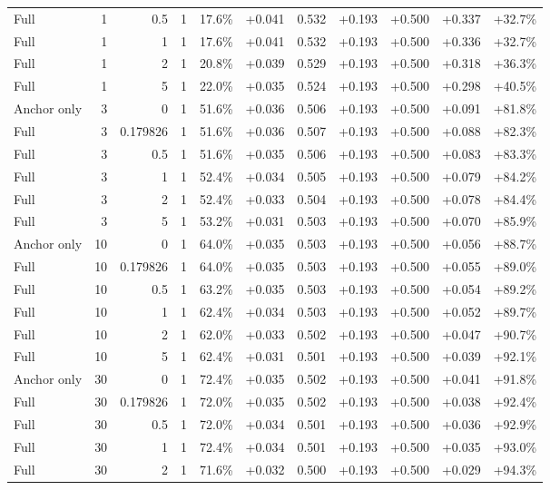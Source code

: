 \begin{table}[htbp]
\begin{tabular}{lrrrccccccc}
Full & 1 & 0.5 & 1 & 17.6\% & +0.041 & 0.532 & +0.193 & +0.500 & +0.337 & +32.7\% \\
Full & 1 & 1 & 1 & 17.6\% & +0.041 & 0.532 & +0.193 & +0.500 & +0.336 & +32.7\% \\
Full & 1 & 2 & 1 & 20.8\% & +0.039 & 0.529 & +0.193 & +0.500 & +0.318 & +36.3\% \\
Full & 1 & 5 & 1 & 22.0\% & +0.035 & 0.524 & +0.193 & +0.500 & +0.298 & +40.5\% \\
Anchor only & 3 & 0 & 1 & 51.6\% & +0.036 & 0.506 & +0.193 & +0.500 & +0.091 & +81.8\% \\
Full & 3 & 0.179826 & 1 & 51.6\% & +0.036 & 0.507 & +0.193 & +0.500 & +0.088 & +82.3\% \\
Full & 3 & 0.5 & 1 & 51.6\% & +0.035 & 0.506 & +0.193 & +0.500 & +0.083 & +83.3\% \\
Full & 3 & 1 & 1 & 52.4\% & +0.034 & 0.505 & +0.193 & +0.500 & +0.079 & +84.2\% \\
Full & 3 & 2 & 1 & 52.4\% & +0.033 & 0.504 & +0.193 & +0.500 & +0.078 & +84.4\% \\
Full & 3 & 5 & 1 & 53.2\% & +0.031 & 0.503 & +0.193 & +0.500 & +0.070 & +85.9\% \\
Anchor only & 10 & 0 & 1 & 64.0\% & +0.035 & 0.503 & +0.193 & +0.500 & +0.056 & +88.7\% \\
Full & 10 & 0.179826 & 1 & 64.0\% & +0.035 & 0.503 & +0.193 & +0.500 & +0.055 & +89.0\% \\
Full & 10 & 0.5 & 1 & 63.2\% & +0.035 & 0.503 & +0.193 & +0.500 & +0.054 & +89.2\% \\
Full & 10 & 1 & 1 & 62.4\% & +0.034 & 0.503 & +0.193 & +0.500 & +0.052 & +89.7\% \\
Full & 10 & 2 & 1 & 62.0\% & +0.033 & 0.502 & +0.193 & +0.500 & +0.047 & +90.7\% \\
Full & 10 & 5 & 1 & 62.4\% & +0.031 & 0.501 & +0.193 & +0.500 & +0.039 & +92.1\% \\
Anchor only & 30 & 0 & 1 & 72.4\% & +0.035 & 0.502 & +0.193 & +0.500 & +0.041 & +91.8\% \\
Full & 30 & 0.179826 & 1 & 72.0\% & +0.035 & 0.502 & +0.193 & +0.500 & +0.038 & +92.4\% \\
Full & 30 & 0.5 & 1 & 72.0\% & +0.034 & 0.501 & +0.193 & +0.500 & +0.036 & +92.9\% \\
Full & 30 & 1 & 1 & 72.4\% & +0.034 & 0.501 & +0.193 & +0.500 & +0.035 & +93.0\% \\
Full & 30 & 2 & 1 & 71.6\% & +0.032 & 0.500 & +0.193 & +0.500 & +0.029 & +94.3\% \\

\end{tabular}
\end{table}
